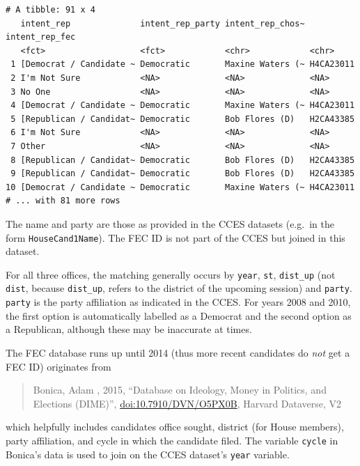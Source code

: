 \documentclass[10pt,article,oneside]{memoir}
\theoremstyle{definition}
\begin{document}
\begin{verbatim}
# A tibble: 91 x 4
   intent_rep              intent_rep_party intent_rep_chos~ intent_rep_fec
   <fct>                   <fct>            <chr>            <chr>         
 1 [Democrat / Candidate ~ Democratic       Maxine Waters (~ H4CA23011     
 2 I'm Not Sure            <NA>             <NA>             <NA>          
 3 No One                  <NA>             <NA>             <NA>          
 4 [Democrat / Candidate ~ Democratic       Maxine Waters (~ H4CA23011     
 5 [Republican / Candidat~ Democratic       Bob Flores (D)   H2CA43385     
 6 I'm Not Sure            <NA>             <NA>             <NA>          
 7 Other                   <NA>             <NA>             <NA>          
 8 [Republican / Candidat~ Democratic       Bob Flores (D)   H2CA43385     
 9 [Republican / Candidat~ Democratic       Bob Flores (D)   H2CA43385     
10 [Democrat / Candidate ~ Democratic       Maxine Waters (~ H4CA23011     
# ... with 81 more rows
\end{verbatim}

The name and party are those as provided in the CCES datasets (e.g.~in
the form \texttt{HouseCand1Name}). The FEC ID is not part of the CCES
but joined in this dataset.

For all three offices, the matching generally occurs by \texttt{year},
\texttt{st}, \texttt{dist\_up} (not \texttt{dist}, because
\texttt{dist\_up}, refers to the district of the upcoming session) and
\texttt{party}. \texttt{party} is the party affiliation as indicated in
the CCES. For years 2008 and 2010, the first option is automatically
labelled as a Democrat and the second option as a Republican, although
these may be inaccurate at times.

The FEC database runs up until 2014 (thus more recent candidates do
\emph{not} get a FEC ID) originates from

\begin{quote}
Bonica, Adam , 2015, ``Database on Ideology, Money in Politics, and
Elections (DIME)'', \url{doi:10.7910/DVN/O5PX0B}, Harvard Dataverse, V2
\end{quote}

which helpfully includes candidates office sought, district (for House
members), party affiliation, and cycle in which the candidate filed. The
variable \texttt{cycle} in Bonica's data is used to join on the CCES
dataset's \texttt{year} variable.
\end{document}
